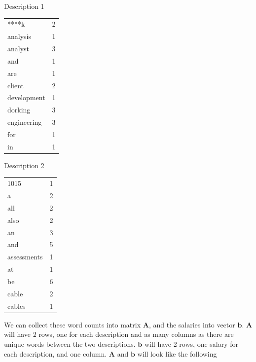 \documentclass[12pt]{article}
\begin{document}
    \begin{center}
    \begin{minipage}[t]{.4\textwidth}
    Description 1
    \newline
    \newline
        \begin{tabular}{l|c}
            ****k & 2 \\
            analysis & 1\\
            analyst & 3\\
            and & 1\\
            are & 1\\
            client & 2\\
            development & 1\\
            dorking & 3\\
            engineering & 3\\
            for & 1\\
            in & 1
        \end{tabular}
    \end{minipage}
    \begin{minipage}[t]{.4\textwidth}
    Description 2
    \newline
    \newline
        \begin{tabular}{l|c}
            1015 & 1 \\
            a & 2 \\
            all & 2 \\
            also & 2\\
            an & 3 \\
            and & 5 \\
            assessments & 1 \\
            at & 1 \\
            be & 6 \\
            cable & 2 \\
            cables & 1
        \end{tabular}
    \end{minipage}
    \end{center}

    We can collect these word counts into matrix $\bm{A}$, and the salaries
    into vector $\bm{b}$. $\bm{A}$ will have 2 rows, one for each
    description and as many columns as there are unique words between the two
    descriptions. $\bm{b}$ will have 2 rows, one salary for each description,
    and one column. $\bm{A}$ and $\bm{b}$ will look like the following
\end{document}

